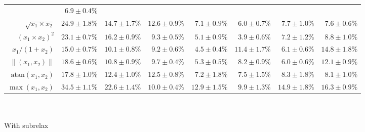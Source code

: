 \begin{table}[t]
\begin{tabular}{r r r r r r r r }
	& \cellcolor{White!58!SteelBlue}$6.9 \pm 0.4\%$
	\\
	$\sqrt{x_1 \times x_2}$ 
	& \cellcolor{White!15!SteelBlue}$24.9 \pm 1.8\%$
	& \cellcolor{White!29!SteelBlue}$14.7 \pm 1.7\%$
	& \cellcolor{White!43!SteelBlue}$12.6 \pm 0.9\%$
	& \cellcolor{White!86!SteelBlue}$7.1 \pm 0.9\%$
	& \cellcolor{White!100!SteelBlue}$\mathbf{6.0 \pm 0.7\%}$
	& \cellcolor{White!58!SteelBlue}$7.7 \pm 1.0\%$
	& \cellcolor{White!72!SteelBlue}$7.6 \pm 0.6\%$
	\\
	$(x_1 \times x_2) ^ 2$ 
	& \cellcolor{White!15!SteelBlue}$23.1 \pm 0.7\%$
	& \cellcolor{White!29!SteelBlue}$16.2 \pm 0.9\%$
	& \cellcolor{White!43!SteelBlue}$9.3 \pm 0.5\%$
	& \cellcolor{White!86!SteelBlue}$5.1 \pm 0.9\%$
	& \cellcolor{White!100!SteelBlue}$\mathbf{3.9 \pm 0.6\%}$
	& \cellcolor{White!72!SteelBlue}$7.2 \pm 1.2\%$
	& \cellcolor{White!58!SteelBlue}$8.8 \pm 1.0\%$
	\\
	$x_1 / (1 + x_2)$ 
	& \cellcolor{White!15!SteelBlue}$15.0 \pm 0.7\%$
	& \cellcolor{White!58!SteelBlue}$10.1 \pm 0.8\%$
	& \cellcolor{White!72!SteelBlue}$9.2 \pm 0.6\%$
	& \cellcolor{White!100!SteelBlue}$\mathbf{4.5 \pm 0.4\%}$
	& \cellcolor{White!43!SteelBlue}$11.4 \pm 1.7\%$
	& \cellcolor{White!86!SteelBlue}$6.1 \pm 0.6\%$
	& \cellcolor{White!29!SteelBlue}$14.8 \pm 1.8\%$
	\\
	$\|(x_1, x_2)\|$ 
	& \cellcolor{White!15!SteelBlue}$18.6 \pm 0.6\%$
	& \cellcolor{White!43!SteelBlue}$10.8 \pm 0.9\%$
	& \cellcolor{White!58!SteelBlue}$9.7 \pm 0.4\%$
	& \cellcolor{White!100!SteelBlue}$\mathbf{5.3 \pm 0.5\%}$
	& \cellcolor{White!72!SteelBlue}$8.2 \pm 0.9\%$
	& \cellcolor{White!86!SteelBlue}$6.0 \pm 0.6\%$
	& \cellcolor{White!29!SteelBlue}$12.1 \pm 0.9\%$
	\\
	$\mathrm{atan}(x_1, x_2)$ 
	& \cellcolor{White!15!SteelBlue}$17.8 \pm 1.0\%$
	& \cellcolor{White!43!SteelBlue}$12.4 \pm 1.0\%$
	& \cellcolor{White!29!SteelBlue}$12.5 \pm 0.8\%$
	& \cellcolor{White!100!SteelBlue}$\mathbf{7.2 \pm 1.8\%}$
	& \cellcolor{White!86!SteelBlue}$7.5 \pm 1.5\%$
	& \cellcolor{White!58!SteelBlue}$8.3 \pm 1.8\%$
	& \cellcolor{White!72!SteelBlue}$8.1 \pm 1.0\%$
	\\
	$\max(x_1, x_2)$ 
	& \cellcolor{White!15!SteelBlue}$34.5 \pm 1.1\%$
	& \cellcolor{White!29!SteelBlue}$22.6 \pm 1.4\%$
	& \cellcolor{White!86!SteelBlue}$10.0 \pm 0.4\%$
	& \cellcolor{White!72!SteelBlue}$12.9 \pm 1.5\%$
	& \cellcolor{White!100!SteelBlue}$\mathbf{9.9 \pm 1.3\%}$
	& \cellcolor{White!58!SteelBlue}$14.9 \pm 1.8\%$
	& \cellcolor{White!43!SteelBlue}$16.3 \pm 0.9\%$
	\\
	\bottomrule
	\end{tabular}\\[0.25cm]
	\raggedright\textsuperscript{\dag}With \gls{subrelax}
	\label{tbl:function_approximations}
\end{table}

